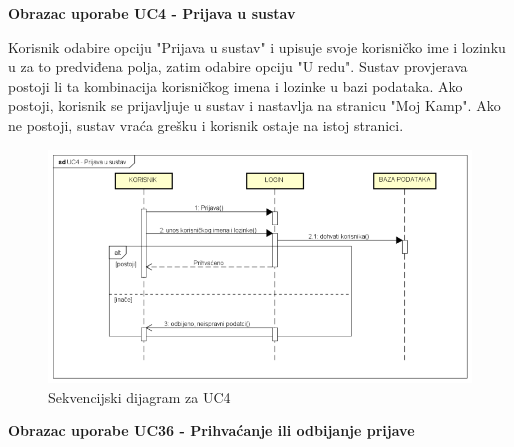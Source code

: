 				\textbf{Obrazac uporabe UC4 - Prijava u sustav}

				\noindent Korisnik odabire opciju "Prijava u sustav" i upisuje svoje korisničko ime i lozinku u za to predviđena polja, zatim odabire opciju "U redu". Sustav provjerava postoji li ta kombinacija korisničkog imena i lozinke u bazi podataka. Ako postoji, korisnik se prijavljuje u sustav i nastavlja na stranicu "Moj Kamp". Ako ne postoji, sustav vraća grešku i korisnik ostaje na istoj stranici.
						
				\begin{figure}[H]
					\centerline{\includegraphics[width=\linewidth]{slike/Sekvencijski_dijagram_UC4.png}}
					\caption{Sekvencijski dijagram za UC4}
					\label{fig:sekvencijskiUC4}
				\end{figure}
				\eject
				
				\noindent\textbf{Obrazac uporabe UC36 - Prihvaćanje ili odbijanje prijave}
					
